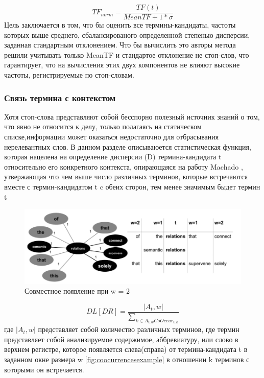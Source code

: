 \begin{equation}
	\label{eq:tfnorm}
	TF_{norm} = \frac{TF(t)}{MeanTF + 1 * \sigma}
\end{equation} 
Цель заключается в том, что бы оценить все термины-кандидаты, частоты которых выше среднего, сбалансированого определенной степенью дисперсии, заданная стандартным отклонением.
Что бы вычислить это авторы метода решили учитывать только MeanTF и стандартое отклонение не стоп-слов, что гарантирует, что на вычисления этих двух компонентов не влияют высокие частоты, регистрируемые по стоп-словам.

\subsubsection{Связь термина с контекстом}
Хотя стоп-слова представляют собой бесспорно полезный источник знаний о том, что явно не относится к делу, только полагаясь на статическом списке,информации может оказаться недостаточно для отбрасывания нерелевантных слов.
В данном разделе описываюется статистическая функция, которая нацелена на определение дисперсии (D) термина-кандидата t относительно его конкретного контекста, опирающаяся на работу Machado \cite{19}, утвержающая что чем выше число различных терминов, которые встречаются вместе с термин-кандидатом t c обеих сторон, тем менее значимым быдет термин t

\begin{figure}[!h]
	\centering
	\includegraphics[width=1\linewidth]{src/img/coocurrences_example}
	\caption{Совместное появление при w = 2}
	\label{fig:coocurrencesexample}
\end{figure}

\begin{equation}
	DL[DR] = \frac{|A_t, w|}{\sum_{k \in A_{t, w}CoOccur_{t, k}}} 
\end{equation}
где $|A_t, w|$ представляет собой количество различных терминов, где термин представляет собой анализируемое содержимое, аббревиатуру, или слово в верхнем регистре, которое появляется слева(справа) от термина-кандидата t в заданном окне размера w \eqref{fig:coocurrencesexample} в отношении k терминов с которыми он встречается.

